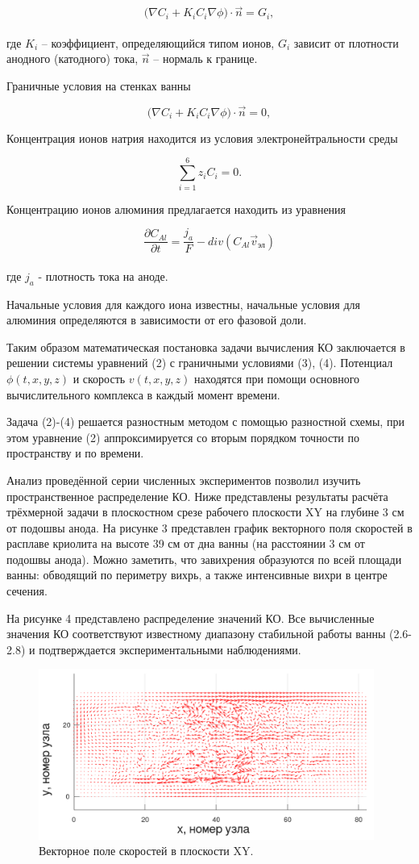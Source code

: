 \documentclass{article}
\begin{document}
\[ \big(\nabla C_i + K_i C_i \nabla \phi \big) \cdot \overrightarrow{n} = G_i, \] 
\\
где $K_i$ – коэффициент, определяющийся типом ионов,  $G_i$ зависит от плотности анодного (катодного) тока, $\overrightarrow{n}$ – нормаль к границе.

Граничные условия на стенках ванны

\[ \big(\nabla C_i + K_i C_i \nabla \phi \big) \cdot \overrightarrow{n} = 0,  \]

Концентрация ионов натрия находится из условия электронейтральности среды

\[ \sum\limits_{i=1}^6 z_iC_i = 0. \]

Концентрацию ионов алюминия предлагается находить из уравнения 

\[ \frac{\partial C_{Al}}{\partial t} = \frac{j_a}{F} - div(C_{Al} \overrightarrow{v}_{\text{эл}}) \]
\\
где $j_a$ - плотность тока на аноде.

Начальные условия для каждого иона известны, начальные условия для алюминия определяются в зависимости от его фазовой доли. 

Таким образом математическая постановка задачи вычисления КО заключается в решении системы уравнений (2) с граничными условиями (3), (4). Потенциал $\phi(t,x,y,z)$ и скорость $v(t,x,y,z)$ находятся при помощи основного вычислительного комплекса в каждый момент времени.

Задача (2)-(4) решается разностным методом с помощью разностной схемы, при этом уравнение (2) аппроксимируется со вторым порядком точности по пространству и по времени.

Анализ проведённой серии численных экспериментов позволил изучить пространственное распределение КО. 
Ниже представлены результаты расчёта трёхмерной задачи в плоскостном срезе рабочего плоскости XY на глубине 3 см от подошвы анода. На рисунке 3 представлен график векторного поля скоростей в расплаве криолита на высоте 39 см от дна ванны (на расстоянии 3 см от подошвы анода). Можно заметить, что завихрения образуются по всей площади ванны: обводящий по периметру вихрь, а также интенсивные вихри в центре сечения.

На рисунке 4 представлено распределение значений КО. Все вычисленные значения КО соответствуют известному диапазону стабильной работы ванны (2.6-2.8) и подтверждается экспериментальными наблюдениями. 

\begin{figure}[h!]
    \centering
    \includegraphics[width=110mm]{veloxy_art.png}
    \caption{Векторное поле скоростей в плоскости XY.}
    \label{fig:3dxyvelo} 
\end{figure}
\end{document}
